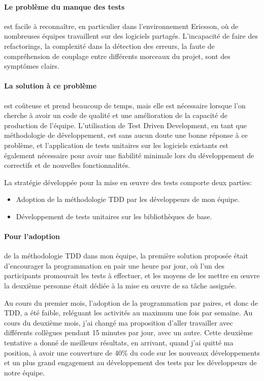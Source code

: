 \documentclass{resume} %
\begin{document}
\paragraph {Le problème du manque des tests} est facile à reconnaître, en particulier dans l'environnement Ericsson, où de nombreuses équipes travaillent sur des logiciels partagés. L'incapacité de faire des refactorings, la complexité dans la détection des erreurs, la faute de compréhension de couplage entre différents morceaux du projet, sont des symptômes clairs. 

\paragraph {La solution à ce problème} est coûteuse et prend beaucoup de temps, mais elle est nécessaire lorsque l'on cherche à avoir un code de qualité et une amélioration de la capacité de production de l'équipe. L'utilisation de Test Driven Development, en tant que méthodologie de développement, est sans aucun doute une bonne réponse à ce problème, et l'application de tests unitaires sur les logiciels existants est également nécessaire pour avoir une fiabilité minimale lors du développement de correctifs et de nouvelles fonctionnalités.

La stratégie développée pour la mise en œuvre des tests comporte deux parties:
\begin {itemize}
\item Adoption de la méthodologie TDD par les développeurs de mon équipe.
\item Développement de tests unitaires sur les bibliothèques de base.
\end {itemize}

\paragraph {Pour l'adoption} de la méthodologie TDD dans mon équipe, la première solution proposée était d'encourager la programmation en pair une heure par jour, où l'un des participants promouvait les tests à effectuer, et les moyens de les mettre en œuvre la deuxième personne était dédiée à la mise en œuvre de sa tâche assignée.

Au cours du premier mois, l'adoption de la programmation par paires, et donc de TDD, a été faible, reléguant les activités au maximum une fois par semaine.
Au cours du deuxième mois, j'ai changé ma proposition d'aller travailler avec différents collègues pendant 15 minutes par jour, avec un autre.
Cette deuxième tentative a donné de meilleurs résultats, en arrivant, quand j'ai quitté ma position, à avoir une couverture de 40\% du code sur les nouveaux développements et un plus grand engagement au développement des tests par les développeurs de notre équipe.
\end{document}
